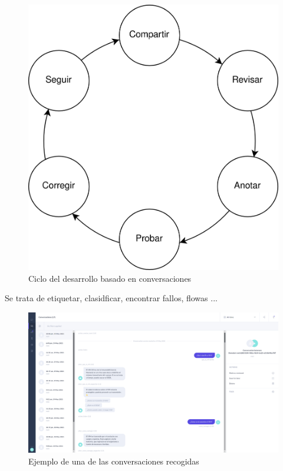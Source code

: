 \begin{figure}[htbp]
\centering
\includegraphics[scale=0.15]{../images/cdd.png} 
\caption{Ciclo del desarrollo basado en conversaciones}
\label{fig:cdd}
\end{figure}

Se trata de etiquetar, clasidficar, encontrar fallos, flowas ...\\	

\begin{figure}[htbp]
\centering
\includegraphics[scale=0.3]{../images/collected_dialogs.png} 
\caption{Ejemplo de una de las conversaciones recogidas}
\label{fig:collected dialogs}
\end{figure}

